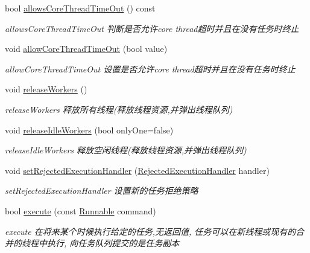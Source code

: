 \begin{DoxyCompactItemize}
bool \hyperlink{classThreadPoolExecutor_acb920195bb39c64c97ed0644693a3592}{allows\+Core\+Thread\+Time\+Out} () const
\begin{DoxyCompactList}\small\item\em allows\+Core\+Thread\+Time\+Out 判断是否允许core thread超时并且在没有任务时终止 \end{DoxyCompactList}\item 
void \hyperlink{classThreadPoolExecutor_aa700bdf61ac6f9a67411560af2871ee7}{allow\+Core\+Thread\+Time\+Out} (bool value)
\begin{DoxyCompactList}\small\item\em allow\+Core\+Thread\+Time\+Out 设置是否允许core thread超时并且在没有任务时终止 \end{DoxyCompactList}\item 
\mbox{\label{classThreadPoolExecutor_af30ac53dafced53fc2c39db7c0633378}} 
void \hyperlink{classThreadPoolExecutor_af30ac53dafced53fc2c39db7c0633378}{release\+Workers} ()
\begin{DoxyCompactList}\small\item\em release\+Workers 释放所有线程(释放线程资源,并弹出线程队列) \end{DoxyCompactList}\item 
void \hyperlink{classThreadPoolExecutor_a0993336e51299da4b9c18d31e45610fe}{release\+Idle\+Workers} (bool only\+One=false)
\begin{DoxyCompactList}\small\item\em release\+Idle\+Workers 释放空闲线程(释放线程资源,并弹出线程队列) \end{DoxyCompactList}\item 
void \hyperlink{classThreadPoolExecutor_ab04e6a91b39073eaafffa8fc22eae325}{set\+Rejected\+Execution\+Handler} (\hyperlink{classRejectedExecutionHandler}{Rejected\+Execution\+Handler} handler)
\begin{DoxyCompactList}\small\item\em set\+Rejected\+Execution\+Handler 设置新的任务拒绝策略 \end{DoxyCompactList}\item 
bool \hyperlink{classThreadPoolExecutor_a04e334b5d7f3b383aa01fbac80120feb}{execute} (const \hyperlink{classRunnable}{Runnable} command)
\begin{DoxyCompactList}\small\item\em execute 在将来某个时候执行给定的任务,无返回值, 任务可以在新线程或现有的合并的线程中执行, 向任务队列提交的是任务副本 \end{DoxyCompactList}\item 

\end{DoxyCompactItemize}
